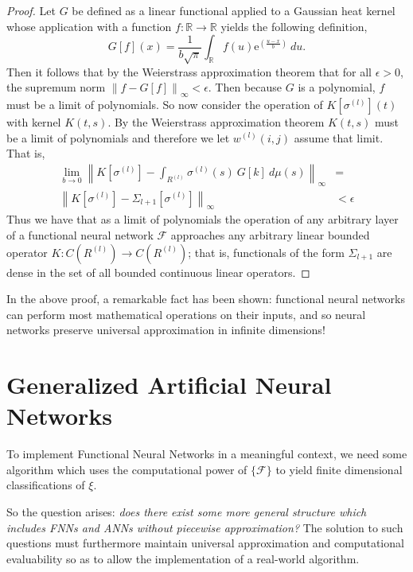 \documentclass{article}
\begin{document}
\begin{proof}
Let $G$ be defined as a linear functional applied to a Gaussian heat kernel whose application with a function $f:\mathbb{R} \to \mathbb{R}$ yields the following definition, \begin{equation}G[f](x) = \frac1{b\sqrt{\pi}}\int_\mathbb{R} f(u)\mathrm{e}^{\left(\frac{u-x}b\right)}\ du.\end{equation}Then it follows that by the Weierstrass approximation theorem that for all $\epsilon > 0$, the supremum norm $\left\|f-G[f]\right\|_\infty < \epsilon$.   Then because $G$ is a polynomial, $f$ must be a limit of polynomials. So now consider the operation of $K\left[\sigma^{(l)}\right](t)$ with kernel  $K(t,s)$. By the Weierstrass approximation theorem $K(t,s)$ must be a limit of polynomials and therefore we let $w^{(l)}(i,j)$ assume that limit. That is,
\begin{equation}
\begin{aligned}
    \lim_{b \to 0}\left\|K\left[\sigma^{(l)}\right] -  \int_{R^{(l)}} \sigma^{(l)}(s)\ G[k]\  d\mu(s) \right\|_\infty &= \\
      \left\|K\left[\sigma^{(l)}\right] -  \Sigma_{l+1}\left[\sigma^{(l)}\right]  \right\|_\infty &< \epsilon
\end{aligned}
 \end{equation}
 Thus we have that as a limit of polynomials the operation of any arbitrary layer of a functional neural network $\mathcal{F}$ approaches any arbitrary linear bounded operator $K:C(R^{(l)})\to C(R^{(l)})$; that is, functionals of the form $\Sigma_{l+1}$ are dense in the set of all bounded continuous linear operators.
\end{proof}


In the above proof, a remarkable fact has been shown: functional neural networks can perform most mathematical operations on their inputs, and so neural networks preserve universal approximation in infinite dimensions!


\section{Generalized Artificial Neural Networks}
To implement Functional Neural Networks in a meaningful context, we need some algorithm
which uses the computational power of $\{\mathcal{F}\}$ to yield finite dimensional classifications of $\xi.$ 

So the question arises: \emph{does there exist some more general structure which includes FNNs and ANNs without piecewise approximation?}  The solution to such questions must furthermore maintain universal approximation and computational evaluability so as to allow the implementation of a real-world algorithm. 
\end{document}
